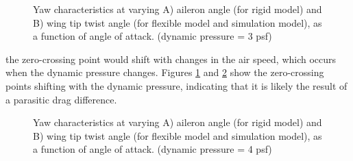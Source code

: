 \documentclass[11pt]{ucthesis}
\begin{document}
\begin{figure}[thpb]
\hfill
{}
\hfill
{}
\hfill
\caption{Yaw characteristics at varying A) aileron angle (for rigid model) and B) wing tip twist angle (for flexible model and simulation model), as a function of angle of attack. (dynamic pressure = 3 psf)}
\label{fig:Q3Yaw}
\end{figure}

the zero-crossing point would shift with changes in the air speed, which occurs when the dynamic pressure changes. Figures \ref{fig:Q3Yaw} and \ref{fig:Q4Yaw} show the zero-crossing points shifting with the dynamic pressure, indicating that it is likely the result of a parasitic drag difference.

\begin{figure}[thpb]
\hfill
{}
\hfill
{}
\hfill
\caption{Yaw characteristics at varying A) aileron angle (for rigid model) and B) wing tip twist angle (for flexible model and simulation model), as a function of angle of attack. (dynamic pressure = 4 psf)}
\label{fig:Q4Yaw}
\end{figure}
\end{document}
